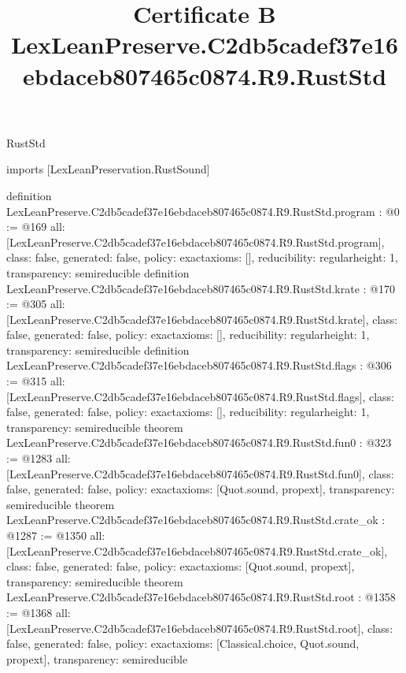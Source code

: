 \begin{lexlean}{RustStd}
\title{Certificate B LexLeanPreserve.C2db5cadef37e16ebdaceb807465c0874.R9.RustStd}
\begin{coremodule}
imports [LexLeanPreservation.RustSound]

definition LexLeanPreserve.C2db5cadef37e16ebdaceb807465c0874.R9.RustStd.program : @0 := @169 {
  all: [LexLeanPreserve.C2db5cadef37e16ebdaceb807465c0874.R9.RustStd.program],
  class: false,
  generated: false,
  policy: exact{axioms: []},
  reducibility: regular{height: 1},
  transparency: semireducible
}
definition LexLeanPreserve.C2db5cadef37e16ebdaceb807465c0874.R9.RustStd.krate : @170 := @305 {
  all: [LexLeanPreserve.C2db5cadef37e16ebdaceb807465c0874.R9.RustStd.krate],
  class: false,
  generated: false,
  policy: exact{axioms: []},
  reducibility: regular{height: 1},
  transparency: semireducible
}
definition LexLeanPreserve.C2db5cadef37e16ebdaceb807465c0874.R9.RustStd.flags : @306 := @315 {
  all: [LexLeanPreserve.C2db5cadef37e16ebdaceb807465c0874.R9.RustStd.flags],
  class: false,
  generated: false,
  policy: exact{axioms: []},
  reducibility: regular{height: 1},
  transparency: semireducible
}
theorem LexLeanPreserve.C2db5cadef37e16ebdaceb807465c0874.R9.RustStd.fun0 : @323 := @1283 {
  all: [LexLeanPreserve.C2db5cadef37e16ebdaceb807465c0874.R9.RustStd.fun0],
  class: false,
  generated: false,
  policy: exact{axioms: [Quot.sound, propext]},
  transparency: semireducible
}
theorem LexLeanPreserve.C2db5cadef37e16ebdaceb807465c0874.R9.RustStd.crate_ok : @1287 := @1350 {
  all: [LexLeanPreserve.C2db5cadef37e16ebdaceb807465c0874.R9.RustStd.crate_ok],
  class: false,
  generated: false,
  policy: exact{axioms: [Quot.sound, propext]},
  transparency: semireducible
}
theorem LexLeanPreserve.C2db5cadef37e16ebdaceb807465c0874.R9.RustStd.root : @1358 := @1368 {
  all: [LexLeanPreserve.C2db5cadef37e16ebdaceb807465c0874.R9.RustStd.root],
  class: false,
  generated: false,
  policy: exact{axioms: [Classical.choice, Quot.sound, propext]},
  transparency: semireducible
}


\end{coremodule}
\end{lexlean}
